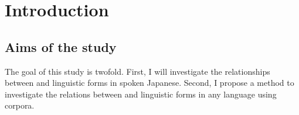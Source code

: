 \chapter{Introduction}\label{Introduction}







\section{Aims of the study}\label{IntroAims}

The goal of this study is twofold.
First,
I will investigate the relationships between  and linguistic forms in spoken Japanese.
Second,
I propose a method to investigate the relations between  and linguistic forms in any language using corpora.

